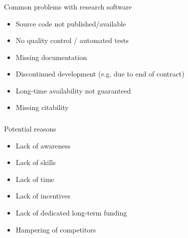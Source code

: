 \documentclass{beamer}
\begin{document}
\begin{frame}
  \frametitle{}
  \begin{block}{}
    \begin{center}
      Common problems with research software\\      
      \begin{itemize}
      \item Source code not published/available
      \item No quality control / automated tests
      \item Missing documentation
      \item Discontinued development (e.g. due to end of contract)
      \item Long-time availability not guaranteed        
      \item Missing citability
      \end{itemize}      
    \end{center}
  \end{block}
\end{frame}

\begin{frame}
  \frametitle{}
  \begin{block}{}
    \begin{center}
      Potential reasons\\
      \begin{itemize}
      \item Lack of awareness
      \item Lack of skills
      \item Lack of time
      \item Lack of incentives
      \item Lack of dedicated long-term funding
      \item Hampering of competitors
    \end{itemize}      
      \end{center}
  \end{block}
\end{frame}
\end{document}
